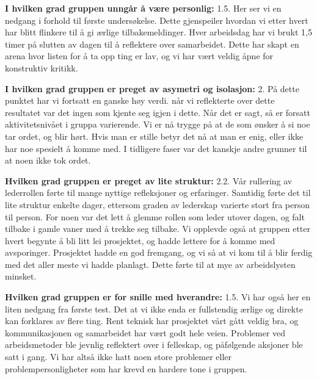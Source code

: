 \noindent \textbf{I hvilken grad gruppen unngår å være personlig:} 1.5.
\newline
\noindent Her ser vi en nedgang i forhold til første undersøkelse. Dette gjenspeiler hvordan vi etter hvert har blitt flinkere til å gi ærlige tilbakemeldinger. Hver arbeidsdag har vi brukt 1,5 timer på slutten av dagen til å reflektere over samarbeidet. 
Dette har skapt en arena hvor listen for å ta opp ting er lav, og vi har vært veldig åpne for konstruktiv kritikk.
\vspace{\secspace}

\noindent \textbf{I hvilken grad gruppen er preget av asymetri og isolasjon:} 2.
\newline
\noindent På dette punktet har vi fortsatt en ganske høy verdi. når vi reflekterte over dette resultatet var det ingen som kjente seg igjen i dette. Når det er sagt, så er forsatt aktivitetsnivået i gruppa varierende.
Vi er nå trygge på at de som ønsker å si noe tar ordet, og blir hørt. Hvis man er stille betyr det nå at man er enig, eller ikke har noe spesielt å komme med. I tidligere faser var det kanskje andre grunner til at noen ikke tok ordet. 

\vspace{\secspace}

\noindent \textbf{Hvilken grad gruppen er preget av lite struktur:} 2.2.
\newline
\noindent Vår rullering av lederrollen førte til mange nyttige refleksjoner og erfaringer. 
Samtidig førte det til lite struktur enkelte dager, ettersom graden av lederskap varierte stort fra person til person. For noen var det lett å glemme rollen som leder utover dagen, og falt tilbake i gamle vaner med å trekke seg tilbake. 
Vi opplevde også at gruppen etter hvert begynte å bli litt lei prosjektet, og hadde lettere for å komme med avsporinger.
Prosjektet hadde en god fremgang, og vi så at vi kom til å blir ferdig med det aller meste vi hadde planlagt.
Dette førte til at mye av arbeidslysten minsket.
\vspace{\secspace}

\noindent \textbf{Hvilken grad gruppen er for snille med hverandre:} 1.5.
\newline
\noindent Vi har også her en liten nedgang fra første test. Det at vi ikke enda er fullstendig ærlige og direkte kan forklares av flere ting. 
Rent teknisk har prosjektet vårt gått veldig bra, og kommunikasjonen og samarbeidet har vært godt hele veien. Problemer ved arbeidsmetoder ble jevnlig reflektert over i felleskap, og påfølgende aksjoner ble satt i gang. Vi har altså ikke hatt noen store problemer eller problempersonligheter som har krevd en hardere tone i gruppen. 
\vspace{\secspace}

